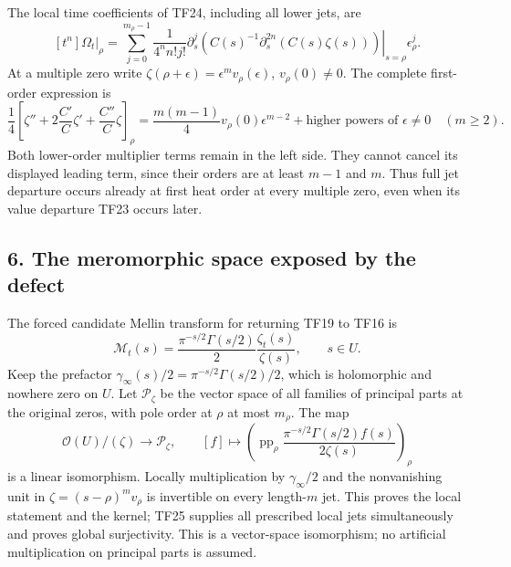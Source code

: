 \documentclass[
  10pt,
  a4paper,
]{article}
\begin{document}
The local time coefficients of TF24, including all lower jets, are \[
[t^n]\Omega_t\big|_\rho
=\sum_{j=0}^{m_\rho-1}\frac{1}{4^n n!j!}
\left.\partial_s^j\left(C(s)^{-1}
\partial_s^{2n}(C(s)\zeta(s))\right)\right|_{s=\rho}
\epsilon_\rho^j.
\tag{TF26}
\] At a multiple zero write
\(\zeta(\rho+\epsilon)=\epsilon^m v_\rho(\epsilon)\), \(v_\rho(0)\ne0\).
The complete first-order expression is \[
\frac14\left[\zeta''+2\frac{C'}C\zeta'
+\frac{C''}C\zeta\right]_\rho
=\frac{m(m-1)}4v_\rho(0)\epsilon^{m-2}
+\text{higher powers of }\epsilon\ne0\quad(m\ge2).
\tag{TF27}
\] Both lower-order multiplier terms remain in the left side. They
cannot cancel its displayed leading term, since their orders are at
least \(m-1\) and \(m\). Thus full jet departure occurs already at first
heat order at every multiple zero, even when its value departure TF23
occurs later.

\subsection{6. The meromorphic space exposed by the
defect}\label{the-meromorphic-space-exposed-by-the-defect}

The forced candidate Mellin transform for returning TF19 to TF16 is \[
\mathcal M_t(s)=
\frac{\pi^{-s/2}\Gamma(s/2)}2\frac{\zeta_t(s)}{\zeta(s)},
\qquad s\in U.
\tag{TF28}
\] Keep the prefactor \(\gamma_\infty(s)/2=\pi^{-s/2}\Gamma(s/2)/2\),
which is holomorphic and nowhere zero on \(U\). Let \(\mathcal P_\zeta\)
be the vector space of all families of principal parts at the original
zeros, with pole order at \(\rho\) at most \(m_\rho\). The map \[
\mathcal O(U)/(\zeta)\longrightarrow\mathcal P_\zeta,
\qquad [f]\longmapsto
\left(\operatorname{pp}_\rho
\frac{\pi^{-s/2}\Gamma(s/2)f(s)}{2\zeta(s)}\right)_\rho
\tag{TF29}
\] is a linear isomorphism. Locally multiplication by
\(\gamma_\infty/2\) and the nonvanishing unit in
\(\zeta=(s-\rho)^m v_\rho\) is invertible on every length-\(m\) jet.
This proves the local statement and the kernel; TF25 supplies all
prescribed local jets simultaneously and proves global surjectivity.
This is a vector-space isomorphism; no artificial multiplication on
principal parts is assumed.
\end{document}
